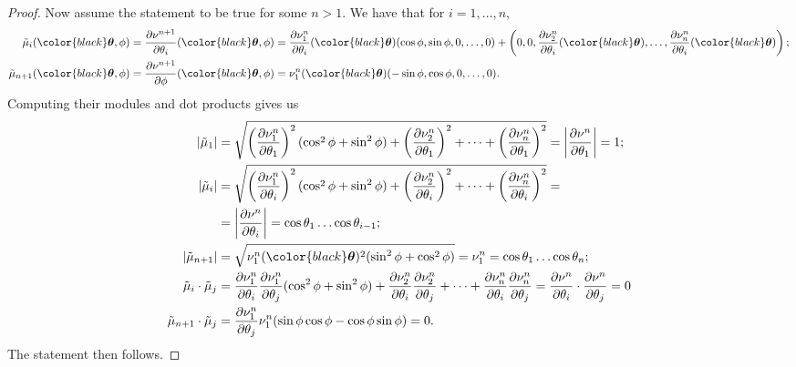 \documentclass{amsart}
\theoremstyle{definition}
\theoremstyle{definition}
\theoremstyle{definition}
\begin{document}
\begin{proof}
	Now assume the statement to be true for some $n > 1$.
	We have that for $i=1,\dots,n$,
	\begin{align*}
		\tilde\mu_i({\color{black}\boldsymbol{\theta}},\phi)&=\frac{\partial \nu^{n+1}}{\partial \theta_i}({\color{black}\boldsymbol{\theta}},\phi)=\frac{\partial \nu^n_1}{\partial \theta_i}({\color{black}\boldsymbol{\theta}})
		(\cos\phi,\sin\phi,0,\dots,0)+\left(0,0,\frac{\partial \nu^n_2}{\partial \theta_i}({\color{black}\boldsymbol{\theta}}),\dots,\frac{\partial \nu^n_n}{\partial \theta_i}({\color{black}\boldsymbol{\theta}})\right);\\
		\tilde\mu_{n+1}({\color{black}\boldsymbol{\theta}},\phi)&
		=\frac{\partial \nu^{n+1}}{\partial \phi}({\color{black}\boldsymbol{\theta}},
		\phi)=\nu^n_1({\color{black}\boldsymbol{\theta}})
		(-\sin\phi,\cos\phi,0,\dots,0).\\
	\end{align*}
	Computing their modules and dot products gives us
	\begin{align*}
		|\tilde\mu_1|&=\sqrt{\left(\frac{\partial \nu^n_1}{\partial \theta_1}\right)^2(\cos^2\phi+\sin^2\phi)+\left(\frac{\partial \nu^n_2}{\partial \theta_1}\right)^2+\dots+\left(\frac{\partial \nu^n_n}{\partial \theta_1}\right)^2}=\left|\frac{\partial \nu^n}{\partial \theta_1}\right|=1;\\
		|\tilde\mu_i|&=\sqrt{\left(\frac{\partial \nu^n_1}{\partial \theta_i}\right)^2(\cos^2\phi+\sin^2\phi)+\left(\frac{\partial \nu^n_2}{\partial \theta_i}\right)^2+\dots+\left(\frac{\partial \nu^n_n}{\partial \theta_i}\right)^2}=\\
			&=\left|\frac{\partial \nu^n}{\partial \theta_i}\right|=\cos\theta_1\dots\cos\theta_{i-1};\\
		|\tilde\mu_{n+1}|&=\sqrt{\nu^n_1({\color{black}\boldsymbol{\theta}})^2(\sin^2\phi+\cos^2\phi)}=\nu^n_1=\cos\theta_1\dots\cos\theta_n;\\
		\tilde\mu_i\cdot\tilde\mu_j&=\frac{\partial \nu^n_1}{\partial \theta_i}\frac{\partial \nu^n_1}{\partial \theta_j}(\cos^2\phi+\sin^2\phi)+\frac{\partial \nu^n_2}{\partial \theta_i}\frac{\partial \nu^n_2}{\partial \theta_j}+\dots+\frac{\partial \nu^n_n}{\partial \theta_i}\frac{\partial \nu^n_n}{\partial \theta_j}=\frac{\partial \nu^n}{\partial \theta_i}\cdot \frac{\partial \nu^n}{\partial \theta_j}=0\\
		\tilde\mu_{n+1}\cdot\tilde\mu_j&=\frac{\partial \nu^n_1}{\partial \theta_j}\nu^n_1(\sin\phi\cos\phi-\cos\phi\sin\phi)=0.
	\end{align*}
	The statement then follows.
\end{proof}
\end{document}

